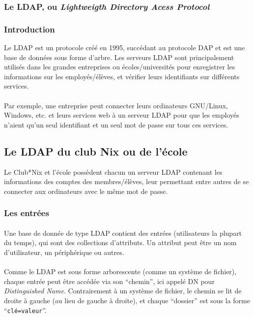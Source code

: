 \subsubsection{Le LDAP, ou \textit{Lightweigth Directory Acess Protocol}}

\subsubsection{Introduction}

Le LDAP est un protocole créé en 1995, succédant au protocole DAP et est une
base de données sous forme d'arbre. Les serveurs LDAP sont principalement
utilisés dans les grandes entreprises ou écoles/universités pour enregistrer
les informations sur les employés/élèves, et vérifier leurs identifiants sur
différents services.

\paragraph{} Par exemple, une entreprise peut connecter leurs ordinateurs
GNU/Linux, Windows, etc. et leurs services web à un serveur LDAP pour que les
employés n'aient qu'un seul identifiant et un seul mot de passe sur tous ces
services.

\subsection{Le LDAP du club Nix ou de l'école}

Le Club*Nix et l'école possèdent chacun un serveur LDAP contenant les
informations des comptes des membres/élèves, leur permettant entre autres de se
connecter aux ordinateurs avec le même mot de passe.

\subsubsection{Les entrées}

\paragraph{} Une base de donnée de type LDAP contient des entrées (utilisateurs la plupart
du temps), qui sont des collections d'attributs. Un attribut peut être un nom
d'utilisateur, un périphérique ou autres.

\paragraph{} Comme le LDAP est sous forme arborescente (comme un système de
fichier), chaque entrée peut être accédée via son ``chemin'', ici appelé DN
pour \textit{Distinguished Name}. Contrairement à un
système de fichier, le chemin se lit de droite à gauche (au lieu de gauche à
droite), et chaque ``dossier'' est sous la forme ``\texttt{clé=valeur}''.

